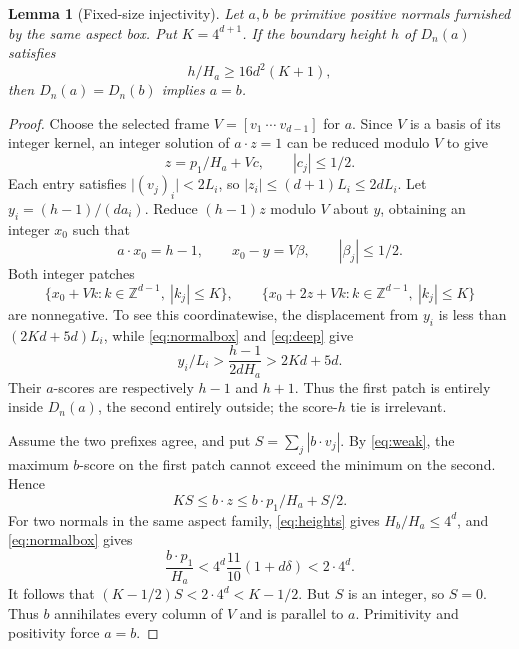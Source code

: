 \documentclass[11pt,a4paper]{article}
\newtheorem{lemma}[theorem]{Lemma}
\theoremstyle{remark}
\newcommand{\Z}{\mathbb Z}
\newcommand{\dd}{\delta}
\begin{document}
\begin{lemma}[Fixed-size injectivity]\label{lem:inject}
Let \(a,b\) be primitive positive normals furnished by the same aspect
box. Put \(K=4^{d+1}\). If the boundary height \(h\) of \(D_n(a)\)
satisfies
\[
 h/H_a\geq16d^2(K+1),
 \tag{10}\label{eq:deep}
\]
then \(D_n(a)=D_n(b)\) implies \(a=b\).
\end{lemma}
\begin{proof}
Choose the selected frame \(V=[v_1\ \cdots\ v_{d-1}]\) for \(a\).
Since \(V\) is a basis of its integer kernel, an integer solution
of \(a\cdot z=1\) can be reduced modulo \(V\) to give
\[
 z=p_1/H_a+Vc,\qquad |c_j|\leq1/2.
 \tag{11}\label{eq:bezout}
\]
Each entry satisfies \(\lvert(v_j)_i\rvert<2L_i\), so
\(\lvert z_i\rvert\leq(d+1)L_i\leq2dL_i\).
Let \(y_i=(h-1)/(d a_i)\). Reduce \((h-1)z\) modulo \(V\) about
\(y\), obtaining an integer \(x_0\) such that
\[
 a\cdot x_0=h-1,\qquad x_0-y=V\beta,\qquad |\beta_j|\leq1/2.
\]
Both integer patches
\[
 \{x_0+Vk:k\in\Z^{d-1},\ |k_j|\leq K\},\qquad
 \{x_0+2z+Vk:k\in\Z^{d-1},\ |k_j|\leq K\}
 \tag{12}\label{eq:patches}
\]
are nonnegative. To see this coordinatewise, the displacement from
\(y_i\) is less than \((2Kd+5d)L_i\), while
\eqref{eq:normalbox} and \eqref{eq:deep} give
\[
 y_i/L_i>\frac{h-1}{2dH_a}>2Kd+5d.
\]
Their \(a\)-scores are respectively \(h-1\) and \(h+1\).
Thus the first patch is entirely inside \(D_n(a)\), the second
entirely outside; the score-\(h\) tie is irrelevant.

Assume the two prefixes agree, and put \(S=\sum_j|b\cdot v_j|\).
By \eqref{eq:weak}, the maximum \(b\)-score on the first patch cannot
exceed the minimum on the second. Hence
\[
 KS\leq b\cdot z
 \leq b\cdot p_1/H_a+S/2.
 \tag{13}\label{eq:patchineq}
\]
For two normals in the same aspect family,
\eqref{eq:heights} gives \(H_b/H_a\leq4^d\), and
\eqref{eq:normalbox} gives
\[
 \frac{b\cdot p_1}{H_a}
 <4^d\frac{11}{10}(1+d\dd)<2\cdot4^d.
\]
It follows that \((K-1/2)S<2\cdot4^d<K-1/2\).
But \(S\) is an integer, so \(S=0\). Thus \(b\) annihilates every
column of \(V\) and is parallel to \(a\). Primitivity and positivity
force \(a=b\).
\end{proof}
\end{document}
